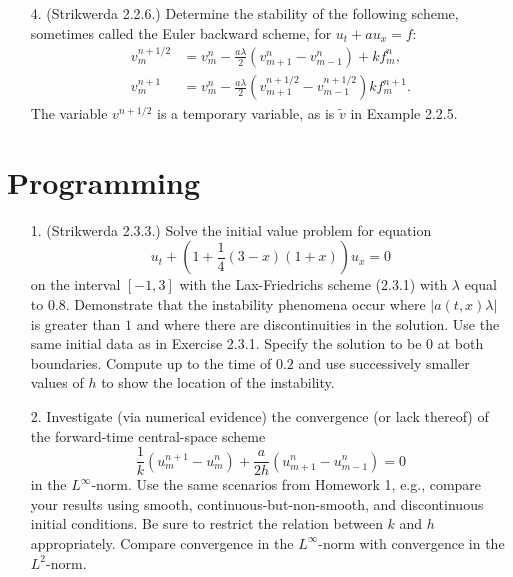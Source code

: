 \documentclass{article}
\providecommand{\abs}[1]{\left\lvert#1\right\rvert}
\begin{document}
\begin{itemize}
\item[4.] (Strikwerda 2.2.6.) Determine the stability of the following scheme, sometimes called the Euler backward scheme, for $u_t + au_x = f$:
\begin{align*}
v^{n+1/2}_m & = v^n_m - \frac{a \lambda}{2} \left( v^n_{m+1} - v^n_{m-1} \right) + k f^n_m, \\
v^{n+1}_m & = v^n_m - \frac{a \lambda}{2} \left( v^{n+1/2}_{m+1} - v^{n+1/2}_{m-1} \right) k f^{n+1}_m.
\end{align*}
The variable $v^{n+1/2}$ is a temporary variable, as is $\tilde{v}$ in Example 2.2.5.

\end{itemize}

\section{Programming}

\begin{itemize}

\item[1.] (Strikwerda 2.3.3.) Solve the initial value problem for equation
\begin{equation*}
u_t + \left( 1 + \frac{1}{4} \left( 3 - x \right) \left( 1 + x \right) \right) u_x = 0
\end{equation*}
on the interval $[-1,3]$ with the Lax-Friedrichs scheme (2.3.1) with $\lambda$ equal to $0.8$. Demonstrate that the instability phenomena occur where $\abs{a(t,x) \lambda}$ is greater than $1$ and where there are discontinuities in the solution. Use the same initial data as in Exercise 2.3.1. Specify the solution to be $0$ at both boundaries. Compute up to the time of $0.2$ and use successively smaller values of $h$ to show the location of the instability.

\item[2.] Investigate (via numerical evidence) the convergence (or lack thereof) of the forward-time central-space scheme
\begin{equation*}
\frac{1}{k} \left( u^{n+1}_m - u^n_m \right) + \frac{a}{2h} \left( u^n_{m+1} - u^n_{m-1} \right) = 0
\end{equation*}
in the $L^{\infty}$-norm. Use the same scenarios from Homework 1, e.g., compare your results using smooth, continuous-but-non-smooth, and discontinuous initial conditions. Be sure to restrict the relation between $k$ and $h$ appropriately. Compare convergence in the $L^{\infty}$-norm with convergence in the $L^2$-norm.

\end{itemize}
\end{document}
